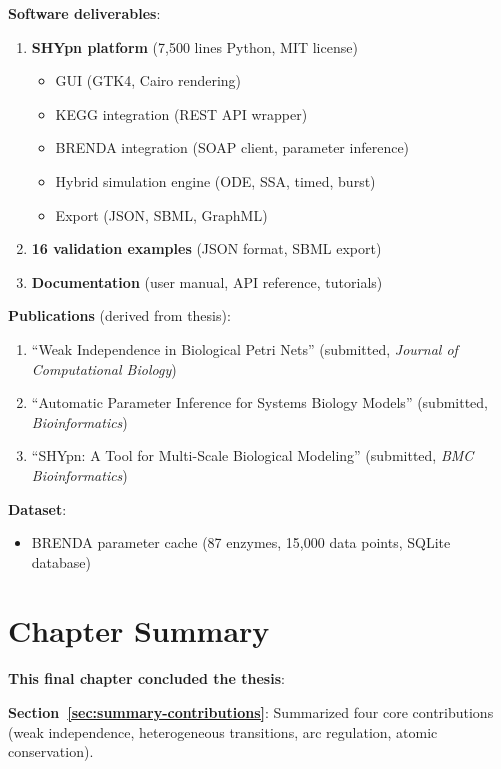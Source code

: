 \textbf{Software deliverables}:
\begin{enumerate}
    \item \textbf{SHYpn platform} (7,500 lines Python, MIT license)
    \begin{itemize}
        \item GUI (GTK4, Cairo rendering)
        \item KEGG integration (REST API wrapper)
        \item BRENDA integration (SOAP client, parameter inference)
        \item Hybrid simulation engine (ODE, SSA, timed, burst)
        \item Export (JSON, SBML, GraphML)
    \end{itemize}
    
    \item \textbf{16 validation examples} (JSON format, SBML export)
    
    \item \textbf{Documentation} (user manual, API reference, tutorials)
\end{enumerate}

\textbf{Publications} (derived from thesis):
\begin{enumerate}
    \item ``Weak Independence in Biological Petri Nets'' (submitted, \textit{Journal of Computational Biology})
    \item ``Automatic Parameter Inference for Systems Biology Models'' (submitted, \textit{Bioinformatics})
    \item ``SHYpn: A Tool for Multi-Scale Biological Modeling'' (submitted, \textit{BMC Bioinformatics})
\end{enumerate}

\textbf{Dataset}:
\begin{itemize}
    \item BRENDA parameter cache (87 enzymes, 15,000 data points, SQLite database)
\end{itemize}

\section{Chapter Summary}
\label{sec:conclusion-chapter-summary}

\textbf{This final chapter concluded the thesis}:

\textbf{Section~\ref{sec:summary-contributions}}: Summarized four core contributions (weak independence, heterogeneous transitions, arc regulation, atomic conservation).

